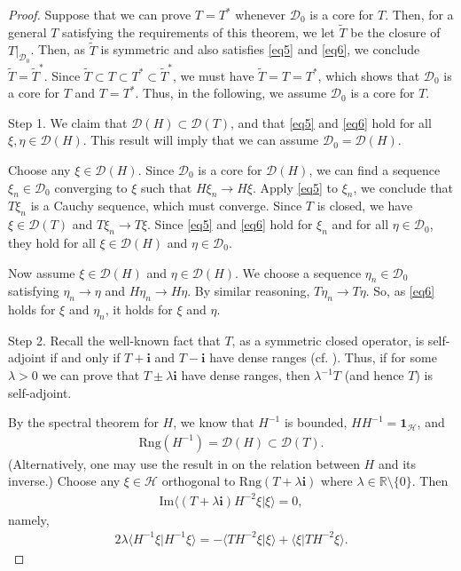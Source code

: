 \documentclass[12pt,a4paper,notitlepage]{article}
\theoremstyle{definition}
\theoremstyle{plain}
\newcommand{\mc}{\mathcal}
\newcommand{\wtd}{\widetilde}
\newcommand{\id}{\mathbf{1}}
\newcommand{\Dom}{\scr D}
\newcommand{\bk}[1]{\langle {#1}\rangle}
\newcommand{\scr}{\mathscr}
\newcommand{\im}{\mathbf{i}}
\newcommand{\Rbb}{\mathbb R}
\newcommand{\Rng}{\mathrm{Rng}}
\numberwithin{equation}{subsection}
\begin{document}
\begin{proof}
	
Suppose that we can prove $T=T^*$ whenever $\Dom_0$ is a core for $T$. Then, for a general $T$ satisfying the requirements of this theorem,	we let $\wtd T$ be the closure of $T|_{\Dom_0}$. Then, as $\wtd T$ is symmetric and also satisfies \eqref{eq5} and \eqref{eq6}, we conclude $\wtd T=\wtd T^*$. Since $\wtd T\subset T\subset T^*\subset \wtd T^*$, we must have $\wtd T=T=T^*$, which shows that $\Dom_0$ is a core for $T$ and $T=T^*$. Thus, in the following, we assume $\Dom_0$ is a core for $T$.


Step 1. We claim that $\Dom(H)\subset\Dom(T)$, and that \eqref{eq5} and \eqref{eq6} hold for all $\xi,\eta\in\Dom(H)$. This result will imply that we can assume $\Dom_0=\Dom(H)$.

Choose any $\xi\in\Dom(H)$. Since $\Dom_0$ is a core for $\Dom(H)$, we can find a sequence $\xi_n\in\Dom_0$ converging to $\xi$ such that $H\xi_n\rightarrow H\xi$. Apply \eqref{eq5} to $\xi_n$, we conclude that $T\xi_n$ is a Cauchy sequence, which must converge. Since $T$ is closed, we have $\xi\in\Dom(T)$ and $T\xi_n\rightarrow T\xi$. Since \eqref{eq5} and \eqref{eq6} hold for $\xi_n$ and for all $\eta\in\Dom_0$, they hold for all $\xi\in\Dom(H)$ and $\eta\in\Dom_0$.

Now assume $\xi\in\Dom(H)$ and $\eta\in\Dom(H)$. We choose a sequence $\eta_n\in\Dom_0$ satisfying $\eta_n\rightarrow\eta$ and $H\eta_n\rightarrow H\eta$. By  similar reasoning, $T\eta_n\rightarrow T\eta$. So, as \eqref{eq6} holds for $\xi$ and $\eta_n$, it holds for $\xi$ and $\eta$.


Step 2. Recall the well-known fact that $T$, as a symmetric closed operator, is self-adjoint if and only if $T+\im$ and $T-\im$ have dense ranges (cf. \cite[Sec. 10]{G-Sp}). Thus, if for some $\lambda>0$ we can prove that $T\pm\lambda\im$ have dense ranges, then $\lambda^{-1}T$ (and hence $T$) is self-adjoint. 

By the spectral theorem for $H$, we know that $H^{-1}$ is bounded, $HH^{-1}=\id_{\mc H}$, and
\begin{align*}
	\Rng(H^{-1})=\Dom(H)\subset\Dom(T).
\end{align*}
(Alternatively, one may use the result in \cite[Sec. 4]{G-Sp} on the relation between $H$ and its inverse.) Choose any $\xi\in\mc H$ orthogonal to $\Rng(T+\lambda\im)$ where $\lambda\in\Rbb\setminus\{0\}$. Then
\begin{align*}
\mathrm{Im}\bk{(T+\lambda\im)H^{-2}\xi|\xi}=0,	
\end{align*}
namely,
\begin{align*}
2\lambda\bk{H^{-1}\xi|H^{-1}\xi}=-\bk{TH^{-2}\xi|\xi}+\bk{\xi|TH^{-2}\xi}.
\end{align*}



\end{proof}
\end{document}

